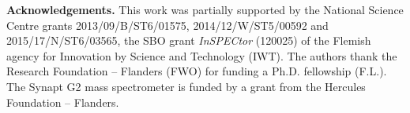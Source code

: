 \documentclass{llncs}
\begin{document}
{\scriptsize\textbf{Acknowledgements.}
        This work was partially supported by the National Science Centre grants 2013/09/B/ST6/01575, 2014/12/W/ST5/00592 and 2015/17/N/ST6/03565, the SBO grant \textit{InSPECtor} (120025) of the Flemish agency for Innovation by Science and Technology (IWT). The authors thank the Research Foundation – Flanders (FWO) for funding a Ph.D. fellowship (F.L.). The Synapt G2 mass spectrometer is funded by a grant from the Hercules Foundation – Flanders.}

{\tiny}
\end{document}
